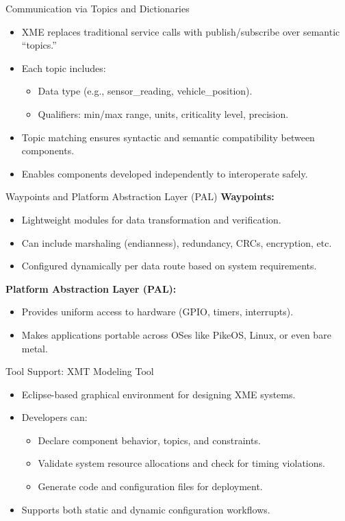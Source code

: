 \documentclass{beamer}
\begin{document}
\begin{frame}{Communication via Topics and Dictionaries}
  \begin{itemize}
    \item XME replaces traditional service calls with publish/subscribe over semantic “topics.”
    \item Each topic includes:
    \begin{itemize}
      \item Data type (e.g., sensor\_reading, vehicle\_position).
      \item Qualifiers: min/max range, units, criticality level, precision.
    \end{itemize}
    \item Topic matching ensures syntactic and semantic compatibility between components.
    \item Enables components developed independently to interoperate safely.
  \end{itemize}
\end{frame}

\begin{frame}{Waypoints and Platform Abstraction Layer (PAL)}
  \textbf{Waypoints:}
  \begin{itemize}
    \item Lightweight modules for data transformation and verification.
    \item Can include marshaling (endianness), redundancy, CRCs, encryption, etc.
    \item Configured dynamically per data route based on system requirements.
  \end{itemize}
  \textbf{Platform Abstraction Layer (PAL):}
  \begin{itemize}
    \item Provides uniform access to hardware (GPIO, timers, interrupts).
    \item Makes applications portable across OSes like PikeOS, Linux, or even bare metal.
  \end{itemize}
\end{frame}

\begin{frame}{Tool Support: XMT Modeling Tool}
  \begin{itemize}
    \item Eclipse-based graphical environment for designing XME systems.
    \item Developers can:
    \begin{itemize}
      \item Declare component behavior, topics, and constraints.
      \item Validate system resource allocations and check for timing violations.
      \item Generate code and configuration files for deployment.
    \end{itemize}
    \item Supports both static and dynamic configuration workflows.
  \end{itemize}
\end{frame}
\end{document}
